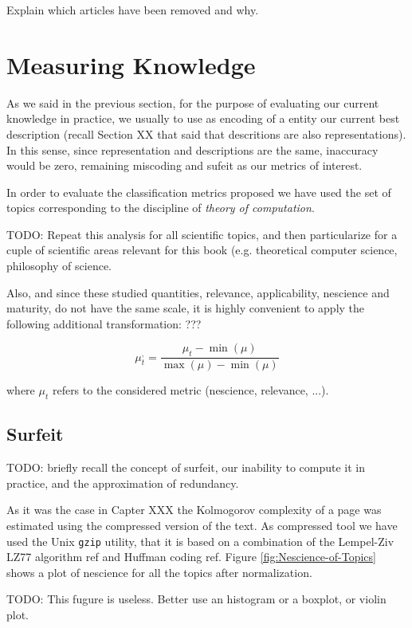 {\color{red} Explain which articles have been removed and why.}

%
%
\section{Measuring Knowledge}

As we said in the previous section, for the purpose of evaluating our current knowledge in practice, we usually to use as encoding of a entity our current best description (recall Section XX that said that descritions are also representations). In this sense, since representation and descriptions are the same, inaccuracy would be zero, remaining miscoding and sufeit as our metrics of interest.

In order to evaluate the classification metrics proposed we have used the set of topics corresponding to the discipline of \emph{theory of computation}.

{\color{red} TODO: Repeat this analysis for all scientific topics, and then particularize for a cuple of scientific areas relevant for this book (e.g. theoretical computer science, philosophy of science.}

Also, and since these studied quantities, relevance, applicability, nescience and maturity, do not have the same scale, it is highly convenient to apply the following additional transformation: ???

\[
\mu_{t}^{,}=\frac{\mu_{t}-\min(\mu)}{\max(\mu)-\min(\mu)}
\]

where $\mu_t$ refers to the considered metric (nescience, relevance, ...). 

\subsection{Surfeit}

{\color{red} TODO: briefly recall the concept of surfeit, our inability to compute it in practice, and the approximation of redundancy.}

As it was the case in Capter {\color{red} XXX} the Kolmogorov complexity of a page was estimated using the compressed version of the text. As compressed tool we have used the Unix \texttt{gzip}
utility, that it is based on a combination of the Lempel-Ziv LZ77 algorithm {\color{red} ref} and Huffman coding {\color{red} ref}. Figure \ref{fig:Nescience-of-Topics} shows a plot of nescience for all the topics after normalization.

{\color{red} TODO: This fugure is useless. Better use an histogram or a boxplot, or violin plot.}

